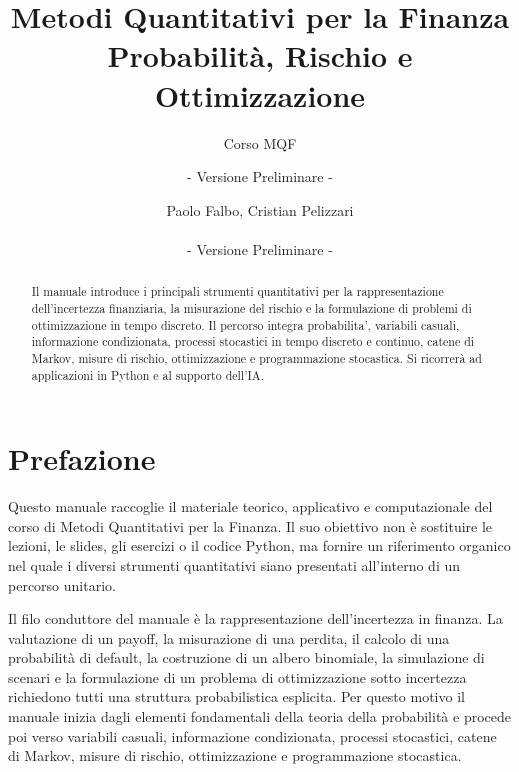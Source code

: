 \documentclass[oneside,openany]{memoir}%
\newcommand{\1}{\mathbf{1}}
\begin{document}
\pagestyle{mqfheadings}

\frontmatter
\title{Metodi Quantitativi per la Finanza\\Probabilit\`{a}, Rischio e Ottimizzazione}
\author{Corso MQF}
\author{- Versione Preliminare -}
\author{Paolo Falbo, Cristian Pelizzari \\
\\
- Versione Preliminare -}
\date{}
\maketitle

\begin{abstract}
Il manuale introduce i principali strumenti quantitativi per la
rappresentazione dell'incertezza finanziaria, la misurazione del rischio e la
formulazione di problemi di ottimizzazione in tempo discreto. Il percorso
integra probabilita', variabili casuali, informazione condizionata, processi
stocastici in tempo discreto e continuo, catene di Markov, misure di rischio,
ottimizzazione e programmazione stocastica. Si ricorrer\`{a} ad applicazioni
in Python e al supporto dell'IA.

\end{abstract}
\begingroup
\hfuzz=2pt
\tableofcontents
\endgroup

\chapter*{Prefazione}


Questo manuale raccoglie il materiale teorico, applicativo e computazionale
del corso di Metodi Quantitativi per la Finanza. Il suo obiettivo non \`{e}
sostituire le lezioni, le slides, gli esercizi o il codice Python, ma fornire
un riferimento organico nel quale i diversi strumenti quantitativi siano
presentati all'interno di un percorso unitario.

Il filo conduttore del manuale \`{e} la rappresentazione dell'incertezza in
finanza. La valutazione di un payoff, la misurazione di una perdita, il
calcolo di una probabilit\`{a} di default, la costruzione di un albero
binomiale, la simulazione di scenari e la formulazione di un problema di
ottimizzazione sotto incertezza richiedono tutti una struttura probabilistica
esplicita. Per questo motivo il manuale inizia dagli elementi fondamentali
della teoria della probabilit\`{a} e procede poi verso variabili casuali,
informazione condizionata, processi stocastici, catene di Markov, misure di
rischio, ottimizzazione e programmazione stocastica.
\end{document}
